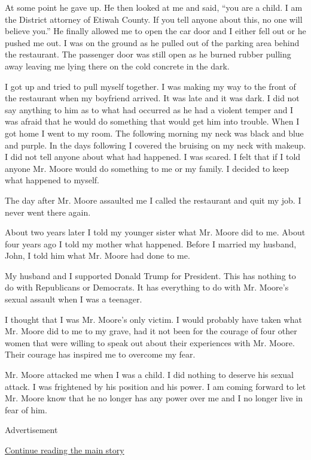 At some point he gave up. He then looked at me and said, ``you are a
child. I am the District attorney of Etiwah County. If you tell anyone
about this, no one will believe you.'' He finally allowed me to open the
car door and I either fell out or he pushed me out. I was on the ground
as he pulled out of the parking area behind the restaurant. The
passenger door was still open as he burned rubber pulling away leaving
me lying there on the cold concrete in the dark.

I got up and tried to pull myself together. I was making my way to the
front of the restaurant when my boyfriend arrived. It was late and it
was dark. I did not say anything to him as to what had occurred as he
had a violent temper and I was afraid that he would do something that
would get him into trouble. When I got home I went to my room. The
following morning my neck was black and blue and purple. In the days
following I covered the bruising on my neck with makeup. I did not tell
anyone about what had happened. I was scared. I felt that if I told
anyone Mr. Moore would do something to me or my family. I decided to
keep what happened to myself.

The day after Mr. Moore assaulted me I called the restaurant and quit my
job. I never went there again.

About two years later I told my younger sister what Mr. Moore did to me.
About four years ago I told my mother what happened. Before I married my
husband, John, I told him what Mr. Moore had done to me.

My husband and I supported Donald Trump for President. This has nothing
to do with Republicans or Democrats. It has everything to do with Mr.
Moore's sexual assault when I was a teenager.

I thought that I was Mr. Moore's only victim. I would probably have
taken what Mr. Moore did to me to my grave, had it not been for the
courage of four other women that were willing to speak out about their
experiences with Mr. Moore. Their courage has inspired me to overcome my
fear.

Mr. Moore attacked me when I was a child. I did nothing to deserve his
sexual attack. I was frightened by his position and his power. I am
coming forward to let Mr. Moore know that he no longer has any power
over me and I no longer live in fear of him.

Advertisement

\protect\hyperlink{after-bottom}{Continue reading the main story}

